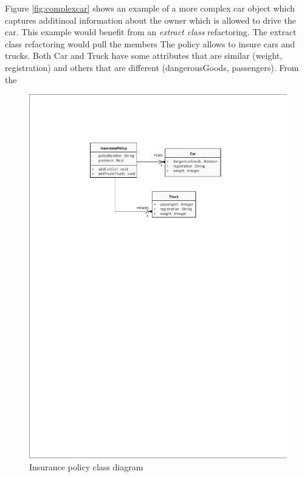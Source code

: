 \documentclass{llncs}
\begin{document}
Figure \ref{fig:complexcar} shows an example of a more complex car object which captures additinoal information about the owner which is allowed to drive the car. This example would benefit from an \textit{extract class} refactoring. The extract class refactoring would pull the members 
The policy allows to insure cars and trucks. Both Car and Truck have some attributes that are similar (weight, registration) and others that
are different (dangerousGoods, passengers). From the 

\begin{figure}[ht]
 \centering
 \includegraphics{images/addCar-class_diagram.pdf}
 \caption{Insurance policy class diagram}
 \label{fig:insurancepolicy}
\end{figure}
\end{document}
